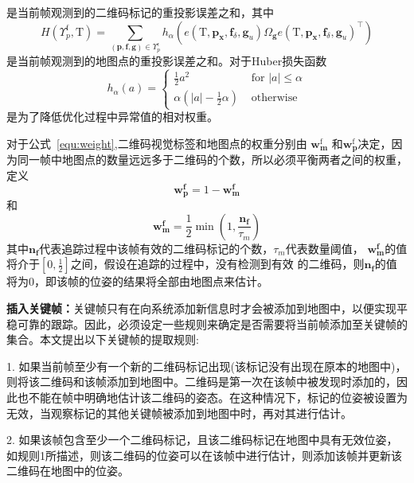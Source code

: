 是当前帧观测到的二维码标记的重投影误差之和，其中
\begin{equation}
H\left(\Upsilon_{p}^{\mathrm{f}}, \mathrm{T}\right)=\sum_{(\mathbf{p}, \mathbf{f}, \mathbf{g}) \in \Upsilon_{p}^{\epsilon}} h_{\alpha}\left(e\left(\mathrm{T}, \mathbf{p}_{\mathbf{x}}, \mathbf{f}_{\delta}, \mathbf{g}_{u}\right) \Omega_{\mathbf{g}} e\left(\mathrm{T}, \mathbf{p}_{\mathbf{x}}, \mathbf{f}_{\delta}, \mathbf{g}_{u}\right)^{\top}\right)
\end{equation}
是当前帧观测到的地图点的重投影误差之和。对于Huber损失函数
\begin{equation}
h_{\alpha}(a)=\left\{\begin{array}{ll}{\frac{1}{2} a^{2}} & {\text { for }|a| \leq \alpha} \\ {\alpha\left(|a|-\frac{1}{2} \alpha\right)} & {\text { otherwise }}\end{array}\right.
\end{equation}
是为了降低优化过程中异常值的相对权重。

对于公式~\ref{equ:weight},二维码视觉标签和地图点的权重分别由
$\mathbf{w}_{\mathbf{m}}^{\mathrm{f}}$
和$\mathbf{w}_{\mathbf{p}}^{\mathrm{f}}$决定，因为同一帧中地图点的数量远远多于二维码的个数，所以必须平衡两者之间的权重，
定义
\begin{equation}
\mathbf{w}_{\mathbf{p}}^{\mathbf{f}}=1-\mathbf{w}_{\mathbf{m}}^{\mathbf{f}}
\end{equation}
和
\begin{equation}
  \mathbf{w}_{\mathbf{m}}^{\mathbf{f}}=\frac{1}{2} \min \left(1, \frac{\mathbf{n}_{\mathbf{f}}}{\tau_{m}}\right)
\end{equation}
其中$\mathbf{n}_{\mathbf{f}}$代表追踪过程中该帧有效的二维码标记的个数，${\tau_{m}}$代表数量阈值，
$\mathbf{w}_{\mathbf{m}}^{\mathbf{f}}$的值将介于$\left[0, \frac{1}{2}\right]$之间，假设在追踪的过程中，没有检测到有效
的二维码，则$\mathbf{n}_{\mathbf{f}}$的值将为0，即该帧的位姿的结果将全部由地图点来估计。

\textbf{插入关键帧：}关键帧只有在向系统添加新信息时才会被添加到地图中，以便实现平稳可靠的跟踪。因此，必须设定一些规则来确定是否需要将当前帧添加至关键帧的集合。本文提出以下关键帧的提取规则:

1. 如果当前帧至少有一个新的二维码标记出现(该标记没有出现在原本的地图中)，则将该二维码和该帧添加到地图中。二维码是第一次在该帧中被发现时添加的，因此也不能在帧中明确地估计该二维码的姿态。在这种情况下，标记的位姿被设置为无效，当观察标记的其他关键帧被添加到地图中时，再对其进行估计。

2. 如果该帧包含至少一个二维码标记，且该二维码标记在地图中具有无效位姿，如规则1所描述，则该二维码的位姿可以在该帧中进行估计，则添加该帧并更新该二维码在地图中的位姿。

